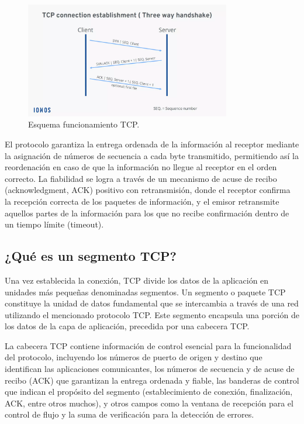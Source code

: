 \begin{figure}[htbp]
    \centering
    \includegraphics[width=0.8\textwidth]{./img/ent-problema/EsquemaTCP.png}
    \caption{Esquema funcionamiento TCP. \cite{tcpprotocolionos}}
    \label{fig:EsquemaTCP}
\end{figure}

El protocolo garantiza la entrega ordenada de la información al receptor mediante la asignación de números de secuencia a cada byte transmitido, permitiendo así la reordenación en caso de que la información no llegue al receptor en el orden correcto. La fiabilidad se logra a través de un mecanismo de acuse de recibo (acknowledgment, ACK) positivo con retransmisión, donde el receptor confirma la recepción correcta de los paquetes de información, y el emisor retransmite aquellos partes de la información para los que no recibe confirmación dentro de un tiempo límite (timeout).

\subsection{¿Qué es un segmento TCP?}
Una vez establecida la conexión, TCP divide los datos de la aplicación en unidades más pequeñas denominadas segmentos. Un segmento o paquete TCP constituye la unidad de datos fundamental que se intercambia a través de una red utilizando el mencionado protocolo TCP. Este segmento encapsula una porción de los datos de la capa de aplicación, precedida por una cabecera TCP. 

La cabecera TCP contiene información de control esencial para la funcionalidad del protocolo, incluyendo los números de puerto de origen y destino que identifican las aplicaciones comunicantes, los números de secuencia y de acuse de recibo (ACK) que garantizan la entrega ordenada y fiable, las banderas de control que indican el propósito del segmento (establecimiento de conexión, finalización, ACK, entre otros muchos), y otros campos como la ventana de recepción para el control de flujo y la suma de verificación para la detección de errores.


